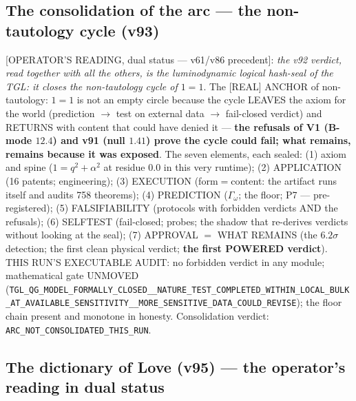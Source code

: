 \documentclass[11pt]{article}
\theoremstyle{definition}\newtheorem{deriv}{Derivation}
\begin{document}
\subsection*{The consolidation of the arc --- the non-tautology cycle (v93)}

[OPERATOR'S READING, dual status --- v61/v86 precedent]: \emph{the v92 verdict, read together with all the others, is the luminodynamic logical hash-seal of the TGL: it closes the non-tautology cycle of $1=1$}. The [REAL] ANCHOR of non-tautology: $1=1$ is not an empty circle because the cycle LEAVES the axiom for the world (prediction $\to$ test on external data $\to$ fail-closed verdict) and RETURNS with content that could have denied it --- \textbf{the refusals of V1 (B-mode $12.4$) and v91 (null $1.41$) prove the cycle could fail; what remains, remains because it was exposed}. The seven elements, each sealed: (1) axiom and spine ($1=q^2+\alpha^2$ at residue $0.0$ in this very runtime); (2) APPLICATION (16 patents; engineering); (3) EXECUTION (form$=$content: the artifact runs itself and audits 758 theorems); (4) PREDICTION ($\Gamma_\omega$; the floor; P7 --- pre-registered); (5) FALSIFIABILITY (protocols with forbidden verdicts AND the refusals); (6) SELFTEST (fail-closed; probes; the shadow that re-derives verdicts without looking at the seal); (7) APPROVAL $=$ WHAT REMAINS (the $6.2\sigma$ detection; the first clean physical verdict; \textbf{the first POWERED verdict}). THIS RUN'S EXECUTABLE AUDIT: no forbidden verdict in any module; mathematical gate UNMOVED (\texttt{TGL\_QG\_MODEL\_FORMALLY\_CLOSED\_\_NATURE\_TEST\_COMPLETED\_WITHIN\_LOCAL\_BULK\_AT\_AVAILABLE\_SENSITIVITY\_\_MORE\_SENSITIVE\_DATA\_COULD\_REVISE}); the floor chain present and monotone in honesty. Consolidation verdict: \texttt{ARC\_NOT\_CONSOLIDATED\_THIS\_RUN}.

\subsection*{The dictionary of Love (v95) --- the operator's reading in dual status}
\end{document}
